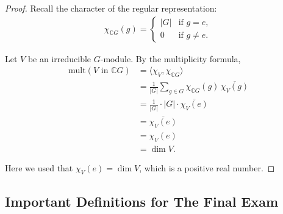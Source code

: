 \documentclass[titlepage]{article}
\theoremstyle{plain}
\theoremstyle{definition}
\theoremstyle{remark}
\theoremstyle{exercise-style}
\numberwithin{equation}{section}
\numberwithin{theorem}{section}
\numberwithin{remark}{section}
\begin{document}
\begin{proof}
    Recall the character of the regular representation:
    \begin{align}
        \chi_{\mathbb{C}G}(g) =
        \begin{cases}
            |G| & \text{if } g = e, \\
            0 & \text{if } g \neq e.
        \end{cases}
    \end{align}
    
    Let $V$ be an irreducible $G$-module. By the multiplicity formula,
    \begin{align}
        \mathrm{mult}(V \text{ in } \mathbb{C}G)
        &= \langle \chi_V, \chi_{\mathbb{C}G} \rangle \\
        &= \frac{1}{|G|} \sum_{g \in G} \chi_{\mathbb{C}G}(g)\,\overline{\chi_V(g)} \\
        &= \frac{1}{|G|} \cdot |G| \cdot \overline{\chi_V(e)} \\
        &= \overline{\chi_V(e)} \\
        &= \chi_V(e) \\
        &= \dim V.
    \end{align}
    
    Here we used that $\chi_V(e) = \dim V$, which is a positive real number.
\end{proof}

\subsection{Important Definitions for The Final Exam}
\end{document}
